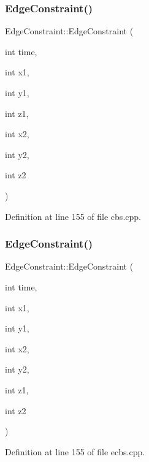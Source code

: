 \subsubsection{\texorpdfstring{Edge\+Constraint()}{EdgeConstraint()}\hspace{0.1cm}{\footnotesize\ttfamily [1/2]}}
{\footnotesize\ttfamily Edge\+Constraint\+::\+Edge\+Constraint (\begin{DoxyParamCaption}\item[{int}]{time,  }\item[{int}]{x1,  }\item[{int}]{y1,  }\item[{int}]{z1,  }\item[{int}]{x2,  }\item[{int}]{y2,  }\item[{int}]{z2 }\end{DoxyParamCaption})\hspace{0.3cm}{\ttfamily [inline]}}



Definition at line 155 of file cbs.\+cpp.

\mbox{\label{struct_edge_constraint_a752ce9d7097739927ba5edcd25f617a7}} 
\subsubsection{\texorpdfstring{Edge\+Constraint()}{EdgeConstraint()}\hspace{0.1cm}{\footnotesize\ttfamily [2/2]}}
{\footnotesize\ttfamily Edge\+Constraint\+::\+Edge\+Constraint (\begin{DoxyParamCaption}\item[{int}]{time,  }\item[{int}]{x1,  }\item[{int}]{y1,  }\item[{int}]{x2,  }\item[{int}]{y2,  }\item[{int}]{z1,  }\item[{int}]{z2 }\end{DoxyParamCaption})\hspace{0.3cm}{\ttfamily [inline]}}



Definition at line 155 of file ecbs.\+cpp.



